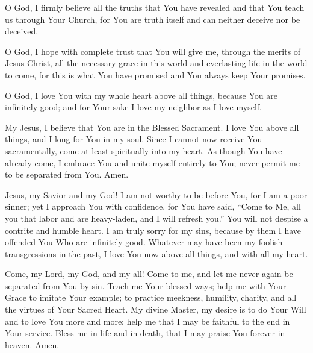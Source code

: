 \label{prayer:act_of_faith}
O God,
I firmly believe all the truths that You have revealed and that You teach us through Your Church, for You are truth itself and can neither deceive nor be deceived.

O God,
I hope with complete trust that You will give me, through the merits of Jesus Christ, all the necessary grace in this world and everlasting life in the world to come, for this is what You have promised and You always keep Your promises.

O God,
I love You with my whole heart above all things, because You are infinitely good; and for Your sake I love my neighbor as I love myself.

My Jesus, I believe that You are in the Blessed Sacrament.
I love You above all things, and I long for You in my soul.
Since I cannot now receive You sacramentally, come at least spiritually into my heart.
As though You have already come, I embrace You and unite myself entirely to You;
never permit me to be separated from You.
Amen.

Jesus, my Savior and my God!
I am not worthy to be before You, for I am a poor sinner;
yet I approach You with confidence, for You have said, ``Come to Me, all you that labor and are heavy-laden, and I will refresh you.''
You will not despise a contrite and humble heart.
I am truly sorry for my sins, because by them I have offended You Who are infinitely good.
Whatever may have been my foolish transgressions in the past, I love You now above all things, and with all my heart.

Come, my Lord, my God, and my all!
Come to me, and let me never again be separated from You by sin.
Teach me Your blessed ways;
help me with Your Grace to imitate Your example;
to practice meekness, humility, charity, and all the virtues of Your Sacred Heart.
My divine Master, my desire is to do Your Will and to love You more and more;
help me that I may be faithful to the end in Your service.
Bless me in life and in death, that I may praise You forever in heaven.
Amen.


